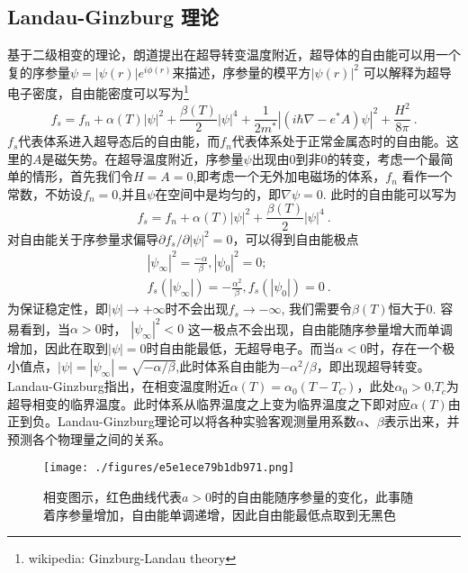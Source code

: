\subsection{Landau-Ginzburg 理论}
基于二级相变的理论，朗道提出在超导转变温度附近，超导体的自由能可以用一个复的序参量$\psi = |\psi(r)|e^{i\phi(r)}$来描述，序参量的模平方$|\psi(r)|^2$ 可以解释为超导电子密度，自由能密度可以写为\footnote{wikipedia: Ginzburg-Landau theory}
\begin{equation}
f_s = f_n + \alpha(T) |\psi|^2 + \frac{\beta(T)}{2} |\psi|^4 + \frac{1}{2m^*} \left| \left(i\hbar \nabla - e^* A \right)\psi \right|^2 + \frac{H^2}{8\pi} \label{eq_gl_1}~.
\end{equation}
$f_s$代表体系进入超导态后的自由能，而$f_n$代表体系处于正常金属态时的自由能。这里的$A$是磁矢势。在超导温度附近，序参量$\psi$出现由0到非0的转变，考虑一个最简单的情形，首先我们令$H=A = 0$,即考虑一个无外加电磁场的体系，$f_n$ 看作一个常数，不妨设$f_n=0$,并且$\psi$在空间中是均匀的，即$\nabla \psi = 0$. 此时的自由能可以写为
\begin{equation}
f_s = f_n + \alpha(T) |\psi|^2 + \frac{\beta(T)}{2} |\psi|^4 ~.
\end{equation}
对自由能关于序参量求偏导$\partial f_s /\partial |\psi|^2 = 0$，可以得到自由能极点
\begin{align}
&|\psi_{\infty}|^2 = \frac{-\alpha}{\beta},|\psi_0|^2 = 0;\\
&f_s(|\psi_{\infty}|) = -\frac{\alpha^2}{\beta}, f_s(|\psi_0|) = 0 ~.
\end{align}
为保证稳定性，即$|\psi|\rightarrow +\infty$时不会出现$f_s \rightarrow -\infty$, 我们需要令$\beta(T)$恒大于0. 容易看到，当$\alpha>0$时， $|\psi_\infty|^2 <0$ 这一极点不会出现，自由能随序参量增大而单调增加，因此在取到$|\psi|=0$时自由能最低，无超导电子。而当$\alpha<0$时，存在一个极小值点，$|\psi| = |\psi_{\infty}| = \sqrt{-\alpha/\beta}$,此时体系自由能为$-\alpha^2/\beta$，即出现超导转变。Landau-Ginzburg指出，在相变温度附近$\alpha(T) = \alpha_0 (T - T_C)$，此处$\alpha_0 > 0$,$T_c$为超导相变的临界温度。此时体系从临界温度之上变为临界温度之下即对应$\alpha(T)$由正到负。Landau-Ginzburg理论可以将各种实验客观测量用系数$\alpha$、$\beta$表示出来，并预测各个物理量之间的关系。
\begin{figure}[ht]
\centering
\texttt{[image: ./figures/e5e1ece79b1db971.png]}
\caption{相变图示，红色曲线代表$a>0$时的自由能随序参量的变化，此事随着序参量增加，自由能单调递增，因此自由能最低点取到无黑色} \label{fig_LanGin_1}
\end{figure}
